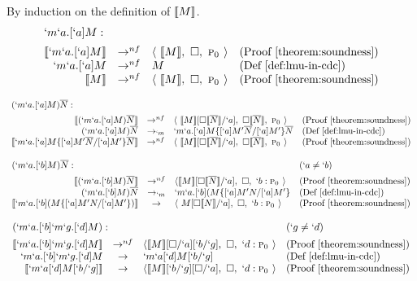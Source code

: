 \begin{Proof}
By induction on the definition of $\llbracket M \rrbracket$.
\[
\begin{array}{rcllll}
\prooflabel{`m`a.[`a]M} \\
  \tr{`m`a.[`a]M} & \to^{nf} & \langle\ \tr{M},\ \square,\ \gp \rangle
          & \text{(Proof \ref{theorem:soundness})} \\
  `m`a.[`a]M & \to^{nf} & M 
          & \text{(Def \ref{def:lmu-in-cdc})} \\
  \tr{M} & \to^{nf} & \langle\ \tr{M},\ \square,\ \gp \rangle 
          & \text{(Proof \ref{theorem:soundness})}
\end{array}
\]

\[
\begin{array}{rclllr}
\prooflabel{(`m`a.[`a]M)\mult{N}} \\
  \tr{(`m`a.[`a]M)\mult{N}} & \to^{nf} & \langle\ \tr{M}[\square\tr{\mult{N}}/`a],\ \square\tr{\mult{N}},\ \gp \rangle
          & \text{(Proof \ref{theorem:soundness})} \\
  (`m`a.[`a]M)\mult{N} & \to_{`m} & `m`a.[`a]M\{[`a]M'\mult{N}/[`a]M'\}\mult{N} 
          & \text{(Def \ref{def:lmu-in-cdc})} \\
  \tr{`m`a.[`a]M\{[`a]M'\mult{N}/[`a]M'\}\mult{N}} & \to^{nf} & \langle\ \tr{M}[\square\tr{\mult{N}}/`a],\ \square\tr{\mult{N}},\ \gp \rangle
          & \text{(Proof \ref{theorem:soundness})}
\end{array}
\]

\[
\begin{array}{rcllll}
  \prooflabel{(`m`a.[`b]M)\mult{N}} & (`a \not= `b) \\
  \tr{(`m`a.[`b]M)\mult{N}} & \to^{nf} & \langle \tr{M}[\square \tr{\mult{N}}/`a],\ \square,\ `b:\gp \rangle
          & \text{(Proof \ref{theorem:soundness})} \\
  (`m`a.[`b]M)\mult{N} & \to_{`m} & `m`a.[`b](M\{[`a]M'N/[`a]M'\}
          & \text{(Def \ref{def:lmu-in-cdc})} \\
  \tr{`m`a.[`b](M\{[`a]M'N/[`a]M'\})} & \to & \langle\ M[\square \tr{N}/`a],\ \square,\ `b:\gp \rangle
          & \text{(Proof \ref{theorem:soundness})}
\end{array}
\]

\[
\begin{array}{rcllll}
\prooflabel{(`m`a.[`b]`m`g.[`d]M)} & (`g \not= `d) \\
  \tr{`m`a.[`b]`m`g.[`d]M} & \to^{nf} & \langle \tr{M}[\square/`a][`b/`g],\ \square,\ `d:\gp \rangle
          & \text{(Proof \ref{theorem:soundness})} \\
  `m`a.[`b]`m`g.[`d]M & \to & `m`a[`d]M[`b/`g]
          & \text{(Def \ref{def:lmu-in-cdc})} \\
\tr{`m`a[`d]M[`b/`g]} & \to & \langle \tr{M}[`b/`g][\square/`a],\ \square,\ `d:\gp \rangle
          & \text{(Proof \ref{theorem:soundness})}
\end{array}
\]


\end{Proof}
